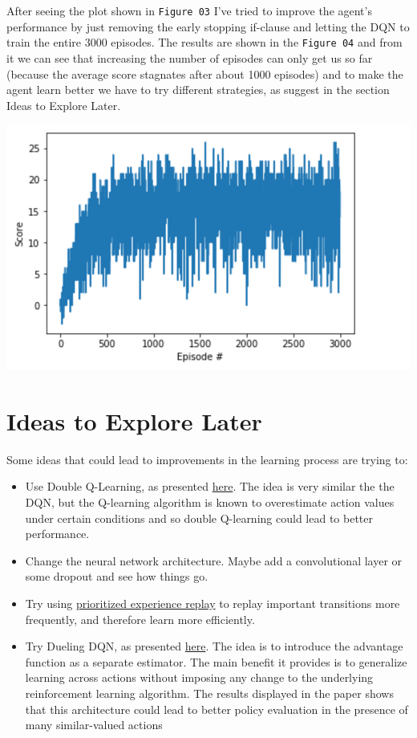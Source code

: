 \documentclass[
]{article}
\begin{document}
After seeing the plot shown in \texttt{Figure\ 03} I've tried to improve
the agent's performance by just removing the early stopping if-clause
and letting the DQN to train the entire 3000 episodes. The results are
shown in the \texttt{Figure\ 04} and from it we can see that increasing
the number of episodes can only get us so far (because the average score
stagnates after about 1000 episodes) and to make the agent learn better
we have to try different strategies, as suggest in the section Ideas to
Explore Later.

\includegraphics{imgs/results_3.png} \pagebreak

\hypertarget{ideas-to-explore-later}{%
\section{Ideas to Explore Later}\label{ideas-to-explore-later}}

Some ideas that could lead to improvements in the learning process are
trying to:

\begin{itemize}
\item
  Use Double Q-Learning, as presented
  \href{https://arxiv.org/pdf/1509.06461}{here}. The idea is very
  similar the the DQN, but the Q-learning algorithm is known to
  overestimate action values under certain conditions and so double
  Q-learning could lead to better performance.
\item
  Change the neural network architecture. Maybe add a convolutional
  layer or some dropout and see how things go.
\item
  Try using \href{https://arxiv.org/pdf/1511.05952}{prioritized
  experience replay} to replay important transitions more frequently,
  and therefore learn more efficiently.
\item
  Try Dueling DQN, as presented
  \href{https://arxiv.org/pdf/1511.06581}{here}. The idea is to
  introduce the advantage function as a separate estimator. The main
  benefit it provides is to generalize learning across actions without
  imposing any change to the underlying reinforcement learning
  algorithm. The results displayed in the paper shows that this
  architecture could lead to better policy evaluation in the presence of
  many similar-valued actions
\end{itemize}
\end{document}

